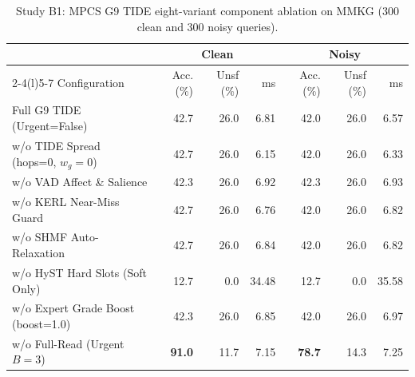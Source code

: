 \documentclass[12pt,a4paper,oneside]{report}
\begin{document}
\begin{table}[H]
\centering
\caption{Study B1: MPCS G9 TIDE eight-variant component ablation on MMKG (300 clean and 300 noisy queries).}
\label{tab:mmkg_b1}
\small
\setlength{\tabcolsep}{4pt}
\begin{tabular}{@{}l rrr rrr@{}}
\toprule
& \multicolumn{3}{c}{Clean} & \multicolumn{3}{c}{Noisy}\\
\cmidrule(lr){2-4}\cmidrule(l){5-7}
Configuration & Acc. (\%) & Unsf (\%) & ms & Acc. (\%) & Unsf (\%) & ms\\
\midrule
Full G9 TIDE (Urgent=False) & 42.7 & 26.0 & 6.81 & 42.0 & 26.0 & 6.57\\
w/o TIDE Spread (hops=0, $w_g=0$) & 42.7 & 26.0 & 6.15 & 42.0 & 26.0 & 6.33\\
w/o VAD Affect \& Salience & 42.3 & 26.0 & 6.92 & 42.3 & 26.0 & 6.93\\
w/o KERL Near-Miss Guard & 42.7 & 26.0 & 6.76 & 42.0 & 26.0 & 6.82\\
w/o SHMF Auto-Relaxation & 42.7 & 26.0 & 6.84 & 42.0 & 26.0 & 6.82\\
w/o HyST Hard Slots (Soft Only) & 12.7 & 0.0 & 34.48 & 12.7 & 0.0 & 35.58\\
w/o Expert Grade Boost (boost=1.0) & 42.3 & 26.0 & 6.85 & 42.0 & 26.0 & 6.97\\
w/o Full-Read (Urgent $B=3$) & \textbf{91.0} & 11.7 & 7.15 & \textbf{78.7} & 14.3 & 7.25\\
\bottomrule
\end{tabular}
\end{table}
\end{document}
